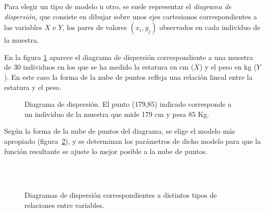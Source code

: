 Para elegir un tipo de modelo u otro, se suele representar el \emph{diagrama de
dispersión}, que consiste en dibujar sobre unos ejes cartesianos
correspondientes a las variables $X$ e $Y$, los pares de valores $(x_i,y_j)$
observados en cada individuo de la muestra.

\begin{ejemplo}
En la figura \ref{g:estatura-peso} aparece el diagrama de dispersión
correspondiente a una muestra de 30 individuos en los que se ha medido la estatura
en cm ($X$) y el peso en kg ($Y$). En este caso la forma de la nube
de puntos refleja una relación lineal entre la estatura y el peso.

\begin{figure}[h!]
  \centering
  \scalebox{0.75}{}
  \caption{Diagrama de dispersión. El punto (179,85) indicado corresponde a un
  individuo de la muestra que mide 179 cm y pesa 85 Kg.}\label{g:estatura-peso}
\end{figure}
\end{ejemplo}

Según la forma de la nube de puntos del diagrama, se elige el modelo más
apropiado (figura~\ref{g:tiposrelaciones}), y se determinan los parámetros de dicho modelo para que la función
resultante se ajuste lo mejor posible a la nube de puntos.

\begin{figure}[h!]
\centering 
{}\qquad
{}\qquad
{}\\
\qquad
{}\qquad
{}\\
\caption{Diagramas de dispersión correspondientes a distintos tipos de relaciones
entre variables.} \label{g:tiposrelaciones}
\end{figure}

\clearpage

